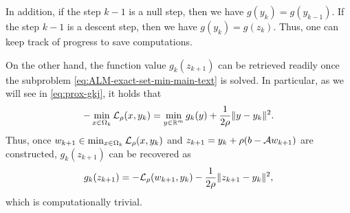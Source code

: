 \documentclass[11pt]{article}
\begin{document}
In addition, if the step $k-1$ is a null step, then we have $g(y_{k}) = g(y_{k-1})$. If the step $k-1$ is a descent step, then we have $g(y_{k}) = g(z_{k})$. Thus, one can keep track of progress to save computations. 

On the other hand, the function value $g_k(z_{k+1})$ can be retrieved readily once the subproblem \eqref{eq:ALM-exact-set-min-main-text} is solved. In particular, as we will see in \eqref{eq:prox-gkj}, it holds that
\begin{align*}
     -\min_{x \in \Omega_{k}}  \mathcal{L}_\rho(x,y_k) = \min_{y \in \mathbb{R}^m} g_{k}(y) + \frac{1}{2\rho}\|y- y_k\|^2.
\end{align*}
Thus, once $w_{k+1} \in \min_{x \in \Omega_{k}}\mathcal{L}_\rho(x,y_k)$ and $z_{k+1} = y_k + \rho (b- \mathcal{A} w_{k+1})$ are constructed, $g_k(z_{k+1})$ can be recovered as 
\begin{align*}
    g_k(z_{k+1}) = -\mathcal{L}_\rho(w_{k+1},y_k) - \frac{1}{2\rho}\|z_{k+1} - y_k\|^2,
\end{align*}
which is computationally trivial.
\end{document}
